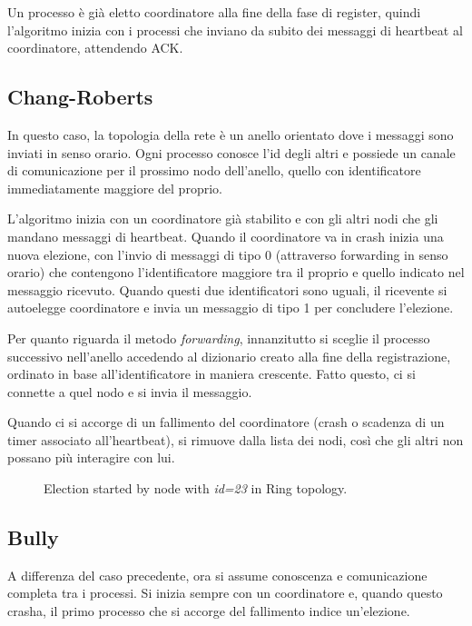 \documentclass[conference]{IEEEtran}
\begin{document}
Un processo è già eletto coordinatore alla fine della fase di register, quindi l'algoritmo inizia con i processi che inviano da subito dei messaggi di heartbeat al coordinatore, attendendo ACK.


\subsection{Chang-Roberts}\label{ring}

In questo caso, la topologia della rete è un anello orientato dove i messaggi sono inviati in senso orario.
Ogni processo conosce l'id degli altri e possiede un canale di comunicazione per il prossimo nodo dell'anello, quello con identificatore immediatamente maggiore del proprio.

L'algoritmo inizia con un coordinatore già stabilito e con gli altri nodi che gli mandano messaggi di heartbeat.
Quando il coordinatore va in crash inizia una nuova elezione, con l'invio di messaggi di tipo 0 (attraverso forwarding in senso orario) che contengono l'identificatore maggiore tra il proprio e quello indicato nel messaggio ricevuto. Quando questi due identificatori sono uguali, il ricevente si autoelegge coordinatore e invia un messaggio di tipo 1 per concludere l'elezione.

Per quanto riguarda il metodo \textit{forwarding}, innanzitutto si sceglie il processo successivo nell'anello accedendo al dizionario creato alla fine della registrazione, ordinato in base all'identificatore in maniera crescente.
Fatto questo, ci si connette a quel nodo e si invia il messaggio.

Quando ci si accorge di un fallimento del coordinatore (crash o scadenza di un timer associato all'heartbeat), si rimuove dalla lista dei nodi, così che gli altri non possano più interagire con lui.

\begin{figure}[htbp]
  \centering
  
  \caption{Election started by node with \textit{id=23} in Ring topology.}
\end{figure}


\subsection{Bully}\label{bully}

A differenza del caso precedente, ora si assume conoscenza e comunicazione completa tra i processi.
Si inizia sempre con un coordinatore e, quando questo crasha, il primo processo che si accorge del fallimento indice un'elezione.
\end{document}
